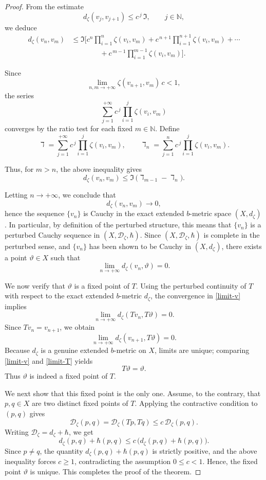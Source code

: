 \documentclass[sn-mathphys-num]{sn-jnl}%
\theoremstyle{thmstyleone}%
\theoremstyle{thmstyletwo}%
\theoremstyle{thmstylethree}%
\numberwithin{equation}{section}
\begin{document}
\begin{proof}
From the estimate
\[
d_{\zeta}(v_j , v_{j+1}) \le c^{\,j}\,\Im, \qquad j\in\mathbb{N},
\]
we deduce
\[
\begin{aligned}
d_{\zeta}(v_n , v_m)
&\le \Im \Big[
c^{n}\prod_{i=1}^{n}\zeta(v_i,v_m)
+ c^{\,n+1}\prod_{i=1}^{n+1}\zeta(v_i,v_m)
+ \cdots  \\
&\qquad\qquad 
+ c^{\,m-1}\prod_{i=1}^{m-1}\zeta(v_i,v_m)
\Big].
\end{aligned}
\]

Since 
\[
\lim_{n,m\to+\infty} \zeta(v_{n+1},v_m)\,c < 1,
\]
the series
\[
\sum_{j=1}^{+\infty} c^{\,j}\prod_{i=1}^{j}\zeta(v_i,v_m)
\]
converges by the ratio test for each fixed $m\in\mathbb{N}$.  
Define
\[
\daleth=\sum_{j=1}^{+\infty} c^{\,j}\prod_{i=1}^{j}\zeta(v_i,v_m),
\qquad
\daleth_n=\sum_{j=1}^{n} c^{\,j}\prod_{i=1}^{j}\zeta(v_i,v_m).
\]

Thus, for $m>n$, the above inequality gives
\[
d_{\zeta}(v_n , v_m)
\le \Im\,\big(\daleth_{m-1}-\daleth_n\big).
\]

Letting $n\to+\infty$, we conclude that 
\[
d_{\zeta}(v_n,v_m)\longrightarrow 0,
\]
hence the sequence $\{v_n\}$ is Cauchy in the exact extended $b$-metric space $(X,d_{\zeta})$. In particular, by definition of the perturbed structure, this means that $\{v_n\}$ is a perturbed Cauchy sequence in $(X,\mathcal{D}_{\zeta},\hbar)$. Since $(X,\mathcal{D}_{\zeta},\hbar)$ is complete in the perturbed sense, and 
$\{v_n\}$ has been shown to be Cauchy in $(X,d_{\zeta})$, there exists a point 
$\vartheta \in X$ such that
\begin{equation}\label{limit-v}
\lim_{n \to +\infty} d_{\zeta}(v_n,\vartheta)=0.
\end{equation}

\medskip
We now verify that $\vartheta$ is a fixed point of $T$.  
Using the perturbed continuity of $T$ with respect to the exact extended $b$-metric $d_{\zeta}$, 
the convergence in \eqref{limit-v} implies
\[
\lim_{n\to+\infty} d_{\zeta}(T v_n, T\vartheta)=0.
\]
Since $T v_n = v_{n+1}$, we obtain
\begin{equation}\label{limit-T}
\lim_{n\to+\infty} d_{\zeta}(v_{n+1}, T\vartheta)=0.
\end{equation}
Because $d_{\zeta}$ is a genuine extended $b$-metric on $X$, limits are unique; 
comparing \eqref{limit-v} and \eqref{limit-T} yields
\[
T\vartheta = \vartheta.
\]
Thus $\vartheta$ is indeed a fixed point of $T$.

\medskip
We next show that this fixed point is the only one.  
Assume, to the contrary, that $p,q\in X$ are two distinct fixed points of $T$.  
Applying the contractive condition to $(p,q)$ gives
\[
\mathcal{D}_{\zeta}(p,q)
= \mathcal{D}_{\zeta}(Tp,Tq)
\le c\, \mathcal{D}_{\zeta}(p,q).
\]
Writing $\mathcal{D}_{\zeta}=d_{\zeta}+\hbar$, we get
\[
d_{\zeta}(p,q)+\hbar(p,q)
\le c\,\big( d_{\zeta}(p,q)+\hbar(p,q) \big).
\]
Since $p\neq q$, the quantity $d_{\zeta}(p,q)+\hbar(p,q)$ is strictly positive, and 
the above inequality forces $c\ge 1$, contradicting the assumption $0\le c<1$.
Hence, the fixed point $\vartheta$ is unique. This completes the proof of the theorem.
\end{proof}
\end{document}
